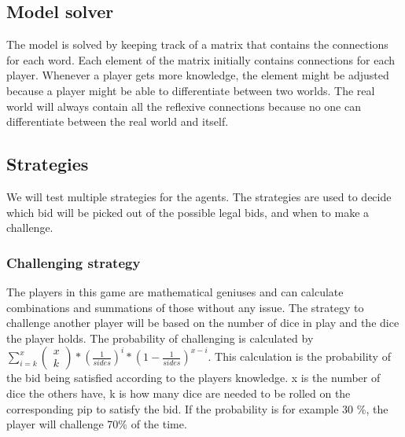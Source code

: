 \documentclass{article}
\begin{document}
\subsection*{Model solver}%
The model is solved by keeping track of a matrix that contains the connections for each word. Each element of the matrix initially contains connections for each player. Whenever a player gets more knowledge, the element might be adjusted because a player might be able to differentiate between two worlds. The real world will always contain all the reflexive connections because no one can differentiate between the real world and itself. 
\subsection*{Strategies} %
We will test multiple strategies for the agents. The strategies are used to decide which bid will be picked out of the possible legal bids, and when to make a challenge.
\subsubsection*{Challenging strategy}
The players in this game are mathematical geniuses and can calculate combinations and summations of those without any issue. The strategy to challenge another player will be based on the number of dice in play and the dice the player holds. The probability of challenging is calculated by $ \sum^{x}_{i=k} \begin{pmatrix}
x\\
k
\end{pmatrix} *(\frac{1}{sides})^i*(1-\frac{1}{sides})^{x-i}$. This calculation is the probability of the bid being satisfied according to the players knowledge. x is the number of dice the others have, k is how many dice are needed to be rolled on the corresponding pip to satisfy the bid. If the probability is for example 30 \%, the player will challenge 70\% of the time.
\end{document}
